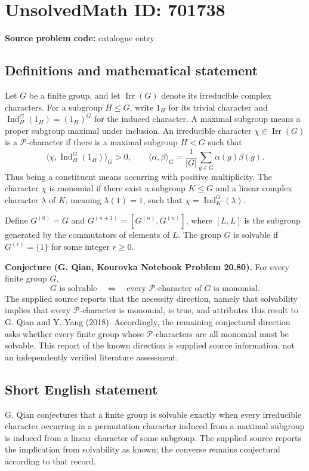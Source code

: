 \documentclass[11pt]{article}
\begin{document}
\section*{UnsolvedMath ID: 701738}
\textbf{Source problem code:} catalogue entry
\subsection{Definitions and mathematical statement}
Let \(G\) be a finite group, and let \(\operatorname{Irr}(G)\) denote its irreducible complex characters. For a subgroup \(H\leq G\), write \(1_H\) for its trivial character and \(\operatorname{Ind}_H^G(1_H)=(1_H)^G\) for the induced character. A maximal subgroup means a proper subgroup maximal under inclusion. An irreducible character \(\chi\in\operatorname{Irr}(G)\) is a \(\mathcal P\)-character if there is a maximal subgroup \(H<G\) such that
\[
\bigl\langle\chi,\operatorname{Ind}_H^G(1_H)\bigr\rangle_G>0,
\qquad
\langle\alpha,\beta\rangle_G=\frac{1}{|G|}\sum_{g\in G}\alpha(g)\overline{\beta(g)}.
\]
Thus being a constituent means occurring with positive multiplicity. The character \(\chi\) is monomial if there exist a subgroup \(K\leq G\) and a linear complex character \(\lambda\) of \(K\), meaning \(\lambda(1)=1\), such that \(\chi=\operatorname{Ind}_K^G(\lambda)\).

Define \(G^{(0)}=G\) and \(G^{(n+1)}=[G^{(n)},G^{(n)}]\), where \([L,L]\) is the subgroup generated by the commutators of elements of \(L\). The group \(G\) is solvable if \(G^{(r)}=\{1\}\) for some integer \(r\geq0\).

\textbf{Conjecture (G. Qian, Kourovka Notebook Problem 20.80).} For every finite group \(G\),
\[
G\text{ is solvable}
\quad\Longleftrightarrow\quad
\text{every }\mathcal P\text{-character of }G\text{ is monomial}.
\]
The supplied source reports that the necessity direction, namely that solvability implies that every \(\mathcal P\)-character is monomial, is true, and attributes this result to G. Qian and Y. Yang (2018). Accordingly, the remaining conjectural direction asks whether every finite group whose \(\mathcal P\)-characters are all monomial must be solvable. This report of the known direction is supplied source information, not an independently verified literature assessment.
\subsection{Short English statement}
G. Qian conjectures that a finite group is solvable exactly when every irreducible character occurring in a permutation character induced from a maximal subgroup is induced from a linear character of some subgroup. The supplied source reports the implication from solvability as known; the converse remains conjectural according to that record.
\end{document}
